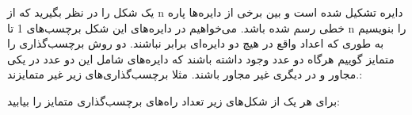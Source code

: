 \p
یک شکل را در نظر بگیرید که از n دایره تشکیل شده است و بین برخی از دایره‌ها پاره خطی رسم شده باشد. می‌خواهیم در دایره‌های این شکل برچسب‌های 1 تا n را بنویسیم 
به طوری که اعداد واقع در هیچ دو دایره‌ای برابر نباشند. دو روش برچسب‌گذاری را متمایز گوییم هرگاه دو عدد وجود داشته باشند که دایره‌های شامل این دو عدد در یکی مجاور و در دیگری غیر مجاور باشند.
مثلا برچسب‌گذاری‌های زیر غیر متمایزند.:

برای هر یک از شکل‌های زیر تعداد راه‌های برچسب‌گذاری متمایز را بیابید:


